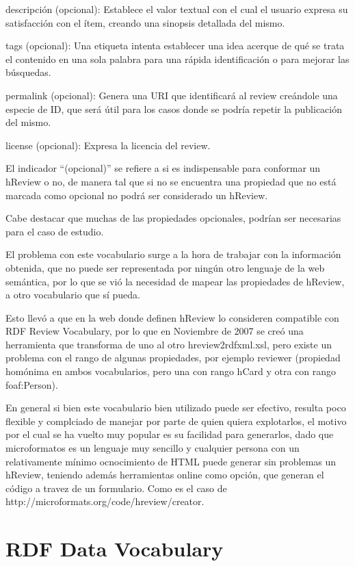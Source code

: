 descripción (opcional): Establece el valor textual con el cual el usuario expresa su satisfacción con el ítem, creando una 
sinopsis detallada del mismo. 

tags (opcional): Una etiqueta intenta establecer una idea acerque de qué se trata el contenido en una sola palabra para una rápida identificación 
o para mejorar las búsquedas. 

permalink (opcional): Genera una URI que identificará al review creándole una especie de ID, que será útil para los casos donde 
se podría repetir la publicación del mismo. 

license (opcional): Expresa la licencia del review.

El indicador ``(opcional)'' se refiere a si es indispensable para conformar un hReview o no, de manera tal que si no se encuentra una 
propiedad que no está marcada como opcional no podrá ser considerado un hReview.

Cabe destacar que muchas de las propiedades opcionales, podrían ser necesarias para el caso de estudio.

El problema con este vocabulario surge a la hora de trabajar con la información obtenida, que no puede ser representada por ningún otro 
lenguaje de la web semántica, por lo que se vió la necesidad de mapear las propiedades de hReview, a otro vocabulario que sí pueda.

Esto llevó a que en la web donde definen hReview lo consideren compatible con RDF Review Vocabulary, por lo que en Noviembre de 2007 
se creó una herramienta que transforma de uno al otro hreview2rdfxml.xsl,  pero existe un problema con el rango de algunas 
propiedades, por ejemplo reviewer (propiedad homónima en ambos vocabularios, pero una con rango hCard y otra con rango foaf:Person).

En general si bien este vocabulario bien utilizado puede ser efectivo, resulta poco flexible y complciado de manejar por parte 
de quien quiera explotarlos, el motivo por el cual se ha vuelto muy popular es su facilidad para generarlos, dado que 
microformatos es un lenguaje muy sencillo y cualquier persona con un relativamente mínimo ocnocimiento de HTML puede generar 
sin problemas un hReview, teniendo además herramientas online como opción, que generan el código a travez de un formulario. 
Como es el caso de http://microformats.org/code/hreview/creator. 


\section{RDF Data Vocabulary}
\label{section:data-vocabulary}


